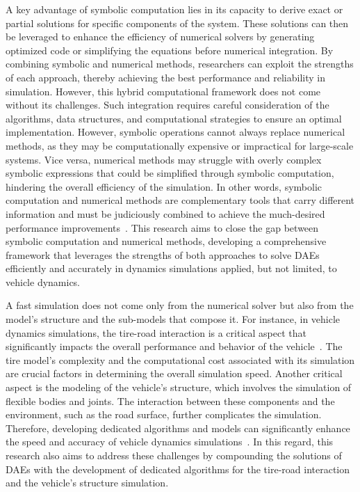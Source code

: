 A key advantage of symbolic computation lies in its capacity to derive exact or partial solutions for specific components of the system. These solutions can then be leveraged to enhance the efficiency of numerical solvers by generating optimized code or simplifying the equations before numerical integration. By combining symbolic and numerical methods, researchers can exploit the strengths of each approach, thereby achieving the best performance and reliability in simulation. However, this hybrid computational framework does not come without its challenges. Such integration requires careful consideration of the algorithms, data structures, and computational strategies to ensure an optimal implementation. However, symbolic operations cannot always replace numerical methods, as they may be computationally expensive or impractical for large-scale systems. Vice versa, numerical methods may struggle with overly complex symbolic expressions that could be simplified through symbolic computation, hindering the overall efficiency of the simulation. In other words, symbolic computation and numerical methods are complementary tools that carry different information and must be judiciously combined to achieve the much-desired performance improvements~\cite{cohen2002computer, cohen2003computer}. This research aims to close the gap between symbolic computation and numerical methods, developing a comprehensive framework that leverages the strengths of both approaches to solve \acp{DAE} efficiently and accurately in dynamics simulations applied, but not limited, to vehicle dynamics.

A fast simulation does not come only from the numerical solver but also from the model's structure and the sub-models that compose it. For instance, in vehicle dynamics simulations, the tire-road interaction is a critical aspect that significantly impacts the overall performance and behavior of the vehicle~\cite{nakajima2019advanced}. The tire model's complexity and the computational cost associated with its simulation are crucial factors in determining the overall simulation speed. Another critical aspect is the modeling of the vehicle's structure, which involves the simulation of flexible bodies and joints. The interaction between these components and the environment, such as the road surface, further complicates the simulation. Therefore, developing dedicated algorithms and models can significantly enhance the speed and accuracy of vehicle dynamics simulations~\cite{pankiewicz2003off}. In this regard, this research also aims to address these challenges by compounding the solutions of \acp{DAE} with the development of dedicated algorithms for the tire-road interaction and the vehicle's structure simulation.

